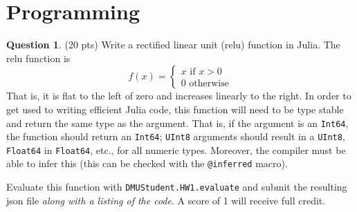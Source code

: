 \documentclass{article}
\theoremstyle{definition}
\newtheorem{question}[thm]{Question}
\begin{document}
\section{Programming}

\begin{question} (20 pts)
    Write a rectified linear unit (relu) function in Julia. The relu function is
    \begin{equation}
        f(x) = \begin{cases}
            x \text{ if } x > 0 \\
            0 \text{ otherwise}
        \end{cases}
    \end{equation}
    That is, it is flat to the left of zero and increases linearly to the right. In order to get used to writing efficient Julia code, this function will need to be type stable and return the same type as the argument. That is, if the argument is an \texttt{Int64}, the function should return an \texttt{Int64}; \texttt{UInt8} arguments should result in a \texttt{UInt8}, \texttt{Float64} in \texttt{Float64}, etc., for all numeric types. Moreover, the compiler must be able to infer this (this can be checked with the \texttt{@inferred} macro).

    Evaluate this function with \texttt{DMUStudent.HW1.evaluate} and submit the resulting json file \textit{along with a listing of the code}. A score of 1 will receive full credit.
\end{question}
\end{document}
